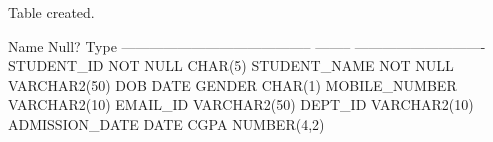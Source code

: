 \vspace{16pt}


\begin{sqlout}
Table created.

 Name                                      Null?    Type
 ----------------------------------------- -------- ----------------------------
 STUDENT_ID                                NOT NULL CHAR(5)
 STUDENT_NAME                              NOT NULL VARCHAR2(50)
 DOB                                                DATE
 GENDER                                             CHAR(1)
 MOBILE_NUMBER                                      VARCHAR2(10)
 EMAIL_ID                                           VARCHAR2(50)
 DEPT_ID                                            VARCHAR2(10)
 ADMISSION_DATE                                     DATE
 CGPA                                               NUMBER(4,2)
\end{sqlout}

\clearpage
